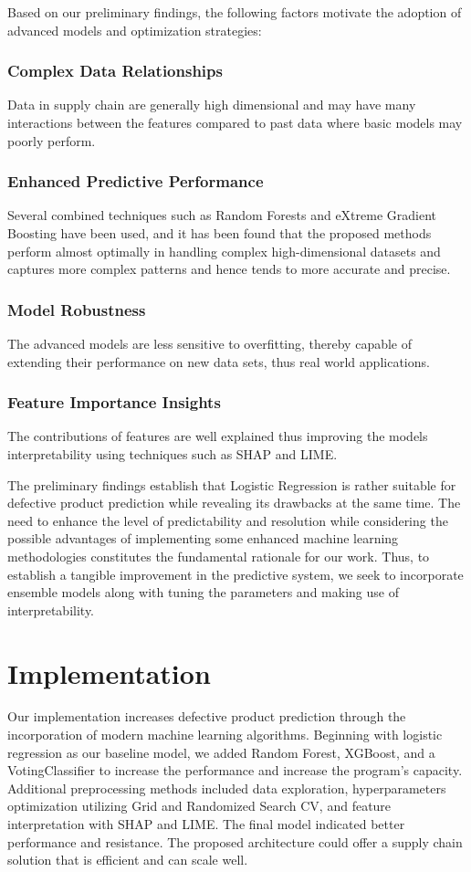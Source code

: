 \documentclass[conference]{IEEEtran}
\begin{document}
Based on our preliminary findings, the following factors motivate the adoption of advanced models and optimization strategies:

\subsubsection{Complex Data Relationships}
Data in supply chain are generally high dimensional and may have many interactions between the features compared to past data where basic models may poorly perform.

\subsubsection{Enhanced Predictive Performance}
Several combined techniques such as Random Forests and eXtreme Gradient Boosting have been used, and it has been found that the proposed methods perform almost optimally in handling complex high-dimensional datasets and captures more complex patterns and hence tends to more accurate and precise.

\subsubsection{Model Robustness}
The advanced models are less sensitive to overfitting, thereby capable of extending their performance on new data sets, thus real world applications.

\subsubsection{Feature Importance Insights}
The contributions of features are well explained thus improving the models interpretability using techniques such as SHAP and LIME.

The preliminary findings establish that Logistic Regression is rather suitable for defective product prediction while revealing its drawbacks at the same time. The need to enhance the level of predictability and resolution while considering the possible advantages of implementing some enhanced machine learning methodologies constitutes the fundamental rationale for our work. Thus, to establish a tangible improvement in the predictive system, we seek to incorporate ensemble models along with tuning the parameters and making use of interpretability.


\section{Implementation}
Our implementation increases defective product prediction through the incorporation of modern machine learning algorithms. Beginning with logistic regression as our baseline model, we added Random Forest, XGBoost, and a VotingClassifier to increase the performance and increase the program’s capacity. Additional preprocessing methods included data exploration, hyperparameters optimization utilizing Grid and Randomized Search CV, and feature interpretation with SHAP and LIME. The final model indicated better performance and resistance. The proposed architecture could offer a supply chain solution that is efficient and can scale well.
\end{document}
